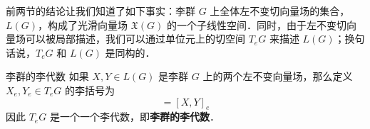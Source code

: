 前两节的结论让我们知道了如下事实：李群 $G$ 上全体左不变切向量场的集合，$L(G)$，构成了光滑向量场 $\mathfrak{X}(G)$ 的一个子线性空间．同时，由于左不变切向量场可以被局部描述，我们可以通过单位元上的切空间 $T_eG$ 来描述 $L(G)$；换句话说，$T_eG$ 和 $L(G)$ 是同构的．

\begin{definition}{李群的李代数}
如果 $X, Y\in L(G)$ 是李群 $G$ 上的两个左不变向量场，那么定义 $X_e, Y_e\in T_eG$ 的李括号为
\begin{equation}
[X_e, Y_e]=[X, Y]_e
\end{equation}
因此 $T_e G$ 是一个一个李代数，即\textbf{李群的李代数}．
\end{definition}














